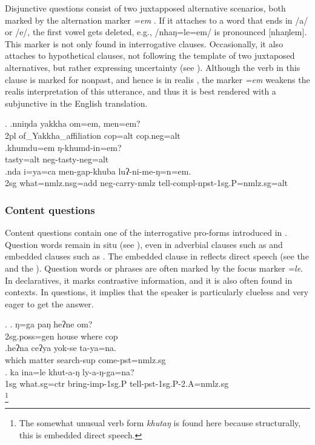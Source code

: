  Disjunctive questions consist of two juxtapposed alternative scenarios, both marked by the alternation marker \emph{=em} \Next. If it attaches to a word that ends in /a/ or /e/, the first vowel gets deleted, e.g., /nhaŋ=le=em/  is pronounced	[nhaŋlem]. This marker is not only found in interrogative clauses. Occasionally, it also attaches to hypothetical clauses, not following the template of two juxtaposed alternatives, but rather expressing uncertainty (see \Next[c]). Although the verb in this clause is marked for nonpast, and hence is in realis , the marker \emph{=em} weakens the realis interpretation of this utterance, and thus it is best rendered with a subjunctive in the English translation.
 
 \ex. \ag.nniŋda yakkha          om=em,    men=em?\\
 {\sc 2pl} of\_Yakkha\_affiliation {\sc cop=alt} {\sc cop.neg=alt}\\
  
 \bg.khumdu=em ŋ-khumd-in=em?\\
 tasty{\sc =alt} {\sc neg-}tasty{\sc -neg=alt}\\
 \bg.nda i=ya=ca men-gap-khuba luʔ-ni-me-ŋ=n=em.\\
 {\sc 2sg} what{\sc =nmlz.nsg=add} {\sc neg-}carry{\sc -nmlz} tell{\sc -compl-npst-1sg.P=nmlz.sg=alt}\\
  
 
\subsubsection{Content questions}

Content questions contain one of the interrogative pro-forms introduced in . Question words remain in situ (see \Next[a]), even in adverbial clauses such as \Next[b] and embedded clauses such as \Next[c]. The embedded clause in \Next[c] reflects direct speech (see the  and the ). Question words or phrases are often marked by the focus marker \emph{=le}. In declaratives, it marks contrastive information,  and it is also often found in  contexts. In questions, it implies that the speaker is particularly clueless and very eager to get the answer.

\ex. \ag. ŋ=ga          paŋ  heʔne om?\\
{\sc 2sg.poss=gen} house where {\sc cop}\\
 
\bg.heʔna ceʔya yok-se ta-ya=na.\\
which  matter search{\sc -sup} come{\sc [3sg]-pst=nmlz.sg}\\
\bg. ka ina=le khut-a-ŋ ly-a-ŋ-ga=na?\\
{\sc 1sg} what{\sc .sg=ctr} bring{\sc -imp-1sg.P} tell{\sc -pst-1sg.P-2.A=nmlz.sg}\\
\footnote{The somewhat unusual verb form \emph{khutaŋ}  is found here because structurally, this is embedded direct speech.}


